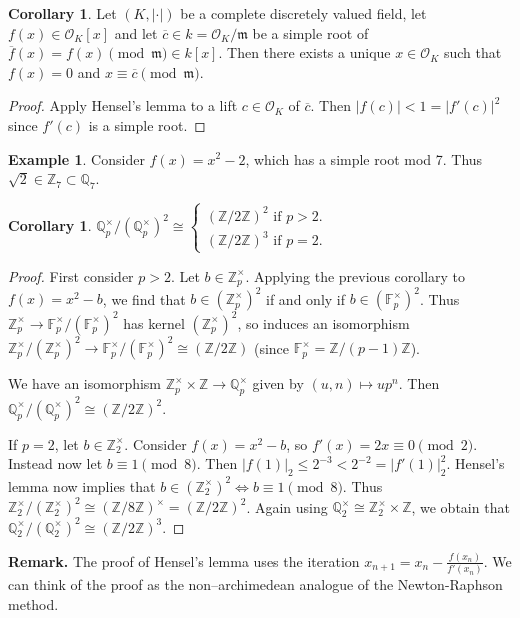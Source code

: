 \documentclass{article}
\theoremstyle{definition}
\newtheorem{cor}[theorem]{Corollary}
\newtheorem{example}{Example}[section]
\begin{document}
\begin{cor}
    Let $(K,|\cdot|)$ be a complete discretely valued field, let $f(x) \in \mathcal{O}_K[x]$ and let $\overline{c} \in k = \mathcal{O}_K/\mathfrak{m}$ be a simple root of $\overline{f}(x) = f(x) \pmod{\mathfrak{m}} \in k[x]$. Then there exists a unique $x \in \mathcal{O}_K$ such that $f(x) = 0$ and $x \equiv \overline{c} \pmod{\mathfrak{m}}$.
\end{cor}
\begin{proof}
    Apply Hensel's lemma to a lift $c \in \mathcal{O}_K$ of $\overline{c}$. Then $|f(c)| < 1 = |f'(c)|^2$ since $f'(c)$ is a simple root.
\end{proof}
\begin{example}
    Consider $f(x) = x^2-2$, which has a simple root mod 7. Thus $\sqrt{2} \in \mathbb{Z}_7 \subset \mathbb{Q}_7$.
\end{example}
\begin{cor}
    $\mathbb{Q}_p^\times/(\mathbb{Q}_p^\times)^2 \cong \begin{cases}
        (\mathbb{Z}/2\mathbb{Z})^2 \text{ if } p>2.\\
        (\mathbb{Z}/2\mathbb{Z})^3 \text{ if } p=2.
    \end{cases}$
\end{cor}
\begin{proof}
    First consider $p>2$. Let $b \in \mathbb{Z}_p^\times$. Applying the previous corollary to $f(x) = x^2-b$, we find that $b \in (\mathbb{Z}_p^\times)^2$ if and only if $b \in (\mathbb{F}_p^\times)^2$. Thus $\mathbb{Z}_p^\times \to \mathbb{F}_p^\times/(\mathbb{F}_p^\times)^2$ has kernel $(\mathbb{Z}_p^\times)^2$, so induces an isomorphism $\mathbb{Z}_p^\times/(\mathbb{Z}_p^\times)^2 \to \mathbb{F}_p^\times/(\mathbb{F}_p^\times)^2 \cong (\mathbb{Z}/2\mathbb{Z})$ (since $\mathbb{F}_p^{\times} = \mathbb{Z}/(p-1)\mathbb{Z}$).
    \vspace{1mm}
     
    We have an isomorphism $\mathbb{Z}_p^\times \times \mathbb{Z} \to \mathbb{Q}_p^{\times}$ given by $(u,n) \mapsto up^n$. Then $\mathbb{Q}_p^\times / (\mathbb{Q}_p^\times)^2 \cong (\mathbb{Z}/2\mathbb{Z})^2$.
    \vspace{1mm}
     
    If $p=2$, let $b \in \mathbb{Z}_2^\times$. Consider $f(x) = x^2 - b$, so $f'(x) = 2x \equiv 0 \pmod{2}$. Instead now let $b \equiv 1 \pmod{8}$. Then $|f(1)|_2 \le 2^{-3} < 2^{-2} = |f'(1)|_2^2$. Hensel's lemma now implies that $b \in (\mathbb{Z}_2^\times)^2 \iff b \equiv 1 \pmod{8}$. Thus $\mathbb{Z}_2^\times / (\mathbb{Z}_2^\times)^2 \cong (\mathbb{Z}/8\mathbb{Z})^\times = (\mathbb{Z}/2\mathbb{Z})^2$. Again using $\mathbb{Q}_2^\times \cong \mathbb{Z}_2^\times \times \mathbb{Z}$, we obtain that $\mathbb{Q}_2^\times/(\mathbb{Q}_2^\times)^2 \cong (\mathbb{Z}/2\mathbb{Z})^3$. 
\end{proof}
\textbf{Remark.} The proof of Hensel's lemma uses the iteration $x_{n+1} = x_n - \frac{f(x_n)}{f'(x_n)}$. We can think of the proof as the non--archimedean analogue of the Newton-Raphson method.
\end{document}
